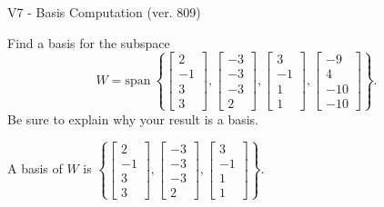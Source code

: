 \begin{exercise}
  \begin{exerciseTitle}V7 - Basis Computation (ver. 809)\end{exerciseTitle}
  \begin{exerciseStatement}
    Find a basis for the subspace 
\[W=\mathrm{span}\ \left\{\left[\begin{array}{r}
2 \\
-1 \\
3 \\
3
\end{array}\right] , \left[\begin{array}{r}
-3 \\
-3 \\
-3 \\
2
\end{array}\right] , \left[\begin{array}{r}
3 \\
-1 \\
1 \\
1
\end{array}\right] , \left[\begin{array}{r}
-9 \\
4 \\
-10 \\
-10
\end{array}\right]\right\}.\]
 Be sure to explain why your result is a basis.


  \end{exerciseStatement}
  \begin{exerciseAnswer}
   A basis of \(W\) is  \(\left\{\left[\begin{array}{r}
2 \\
-1 \\
3 \\
3
\end{array}\right] , \left[\begin{array}{r}
-3 \\
-3 \\
-3 \\
2
\end{array}\right] , \left[\begin{array}{r}
3 \\
-1 \\
1 \\
1
\end{array}\right]\right\}\).
  


  \end{exerciseAnswer}
\end{exercise}